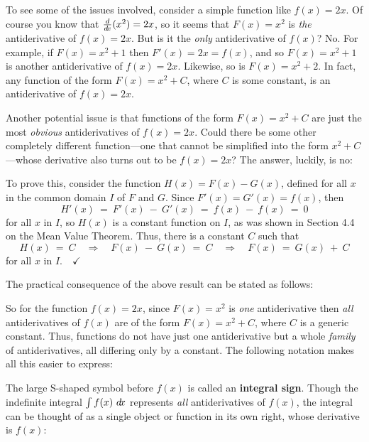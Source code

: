 To see some of the issues involved, consider a simple function like $f(x)=2x$.
Of course you know that $\frac{d}{d\!x}(x^2) = 2x$, so it seems that $F(x)=x^2$ is
\emph{the} antiderivative of $f(x)=2x$. But is it the \emph{only}
antiderivative of $f(x)$? No. For example, if $F(x)=x^2+1$ then $F'(x)=2x=f(x)$,
and so $F(x)=x^2+1$ is another antiderivative of $f(x)=2x$. Likewise, so is
$F(x)=x^2+2$. In fact, any function of the form $F(x)=x^2 + C$, where $C$ is
some constant, is an antiderivative of $f(x)=2x$.

Another potential issue is that functions of the form $F(x)=x^2 + C$ are just
the most \emph{obvious} antiderivatives of $f(x)=2x$. Could there be some other
completely different function---one that cannot be simplified into the form
$x^2 + C$---whose derivative also turns out to be $f(x) =2x$? The answer,
luckily, is no: 


To prove this, consider the function $H(x) = F(x) - G(x)$, defined for all $x$
in the common domain $I$ of $F$ and $G$. Since $F'(x) = G'(x) = f(x)$, then
\[
H'(x) ~=~ F'(x) ~-~ G'(x) ~=~ f(x) ~-~ f(x) ~=~ 0
\]
for all $x$ in $I$, so $H(x)$ is a constant function on $I$, as was shown in
Section 4.4 on the Mean Value Theorem. Thus, there is a constant $C$ such that
\[
H(x) ~=~ C \quad\Rightarrow\quad F(x) ~-~ G(x) ~=~ C \quad\Rightarrow\quad
F(x) ~=~ G(x) ~+~ C
\]
for all $x$ in $I.\quad\checkmark$

The practical consequence of the above result can be stated as follows:


So for the function $f(x) = 2x$, since $F(x) = x^2$ is \emph{one} antiderivative
then \emph{all} antiderivatives of $f(x)$ are of the form $F(x) = x^2 + C$,
where $C$ is a generic constant. Thus, functions do not have just one
antiderivative but a whole \emph{family} of antiderivatives, all differing only
by a constant. The following notation makes all this easier to express:

The large S-shaped symbol before $f(x)$ is called an \textbf{integral sign}.
\newpage
Though the indefinite integral $\int f(x)~d\!x$ represents \emph{all}
antiderivatives of $f(x)$, the integral can be thought of as a single object or
function in its own right, whose derivative is $f(x)$:

